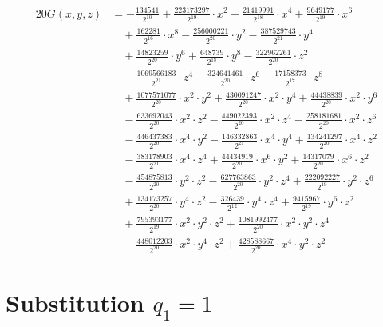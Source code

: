 \begin{align*}20G(x,y,z)&=-\frac{134541}{2^{10}}+\frac{223173297}{2^{19}}\cdot x^{2}-\frac{21419991}{2^{18}}\cdot x^{4}+\frac{9649177}{2^{19}}\cdot x^{6}\\
&\quad +\frac{162281}{2^{16}}\cdot x^{8}-\frac{256000221}{2^{20}}\cdot y^{2}-\frac{387529743}{2^{21}}\cdot y^{4}\\
&\quad +\frac{14823259}{2^{20}}\cdot y^{6}+\frac{648739}{2^{18}}\cdot y^{8}-\frac{322962261}{2^{20}}\cdot z^{2}\\
&\quad -\frac{1069566183}{2^{21}}\cdot z^{4}-\frac{324641461}{2^{20}}\cdot z^{6}-\frac{17158373}{2^{17}}\cdot z^{8}\\
&\quad +\frac{1077571077}{2^{20}}\cdot x^{2}\cdot y^{2}+\frac{430091247}{2^{20}}\cdot x^{2}\cdot y^{4}+\frac{44438839}{2^{20}}\cdot x^{2}\cdot y^{6}\\
&\quad -\frac{633692043}{2^{20}}\cdot x^{2}\cdot z^{2}-\frac{449022393}{2^{20}}\cdot x^{2}\cdot z^{4}-\frac{258181681}{2^{20}}\cdot x^{2}\cdot z^{6}\\
&\quad -\frac{446437383}{2^{20}}\cdot x^{4}\cdot y^{2}-\frac{146332863}{2^{21}}\cdot x^{4}\cdot y^{4}+\frac{134241297}{2^{20}}\cdot x^{4}\cdot z^{2}\\
&\quad -\frac{383178903}{2^{21}}\cdot x^{4}\cdot z^{4}+\frac{44434919}{2^{20}}\cdot x^{6}\cdot y^{2}+\frac{14317079}{2^{20}}\cdot x^{6}\cdot z^{2}\\
&\quad -\frac{454875813}{2^{20}}\cdot y^{2}\cdot z^{2}-\frac{627763863}{2^{20}}\cdot y^{2}\cdot z^{4}+\frac{222092227}{2^{19}}\cdot y^{2}\cdot z^{6}\\
&\quad +\frac{134173257}{2^{20}}\cdot y^{4}\cdot z^{2}-\frac{326439}{2^{12}}\cdot y^{4}\cdot z^{4}+\frac{9415967}{2^{19}}\cdot y^{6}\cdot z^{2}\\
&\quad +\frac{795393177}{2^{19}}\cdot x^{2}\cdot y^{2}\cdot z^{2}+\frac{1081992477}{2^{20}}\cdot x^{2}\cdot y^{2}\cdot z^{4}\\
&\quad -\frac{448012203}{2^{20}}\cdot x^{2}\cdot y^{4}\cdot z^{2}+\frac{428588667}{2^{20}}\cdot x^{4}\cdot y^{2}\cdot z^{2}\end{align*}\section{Substitution $q_1=1$}
